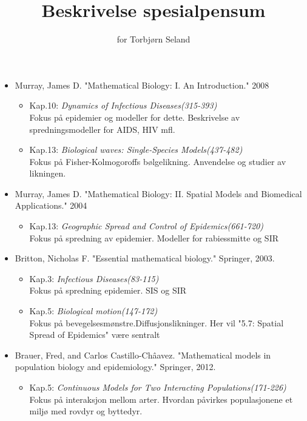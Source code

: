 \documentclass[norsk,11pt.a4paper]{article}
\begin{document}
\title{Beskrivelse spesialpensum}
\author{for Torbjørn Seland}
\maketitle

\begin{itemize}
	\item Murray, James D. "Mathematical Biology: I. An Introduction." 2008
	\begin{itemize}
		\item Kap.10: \emph{Dynamics of Infectious Diseases(315-393)}\\
		Fokus på epidemier og modeller for dette. Beskrivelse av spredningsmodeller 
		for AIDS, HIV mfl.
		\item Kap.13: \emph{Biological waves: Single-Species Models(437-482)}\\
		Fokus på Fisher-Kolmogoroffs bølgelikning. Anvendelse og studier av likningen.
	\end{itemize}
	\item Murray, James D. "Mathematical Biology: II. Spatial Models and Biomedical Applications." 2004
	\begin{itemize}
		\item Kap.13: \emph{Geographic Spread and Control of Epidemics(661-720)}\\
		Fokus på spredning av epidemier. Modeller for rabiessmitte og SIR
	\end{itemize}
	\item Britton, Nicholas F. "Essential mathematical biology." Springer, 2003.
	\begin{itemize}
		\item Kap.3: \emph{Infectious Diseases(83-115)}\\
		Fokus på spredning epidemier. SIS og SIR
		\item Kap.5: \emph{Biological motion(147-172)}\\
		Fokus på bevegelsesmønstre.Diffusjonslikninger. Her vil "5.7: Spatial Spread of Epidemics" være
		sentralt
	\end{itemize}
	\item Brauer, Fred, and Carlos Castillo-Châavez. "Mathematical models in population biology and 		epidemiology." Springer, 2012.
	\begin{itemize}
		\item Kap.5: \emph{Continuous Models for Two Interacting Populations(171-226)}\\
		Fokus på interaksjon mellom arter. Hvordan påvirkes populasjonene et miljø med rovdyr og byttedyr.

\end{itemize}
\end{itemize}
\end{document}
